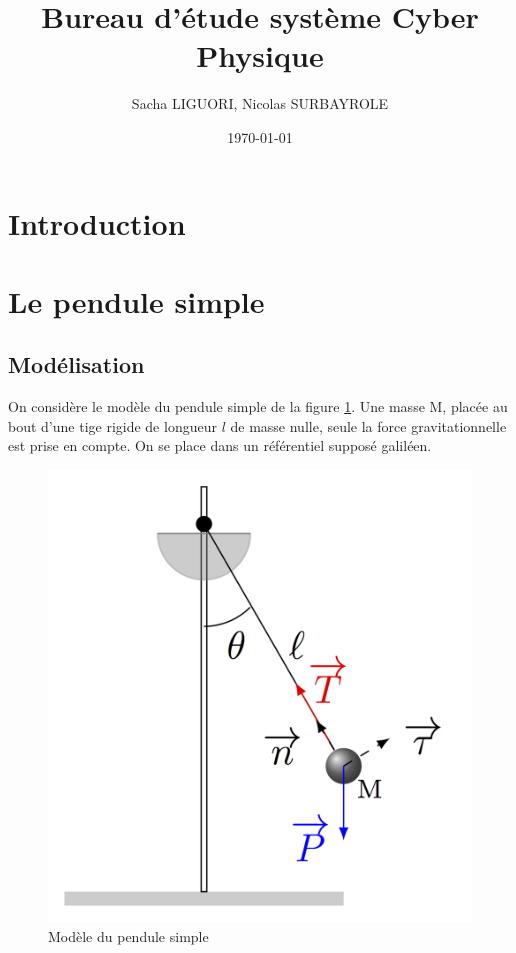 \documentclass[11pt]{article}
\author{Sacha LIGUORI, Nicolas SURBAYROLE}
\title{Bureau d'étude système Cyber Physique}
\date{\today}
\begin{document}
\maketitle

\tableofcontents

\newpage

\section*{Introduction}

\section{Le pendule simple}
\subsection{Modélisation}
On considère le modèle du pendule simple de la figure \ref{model_pendule}. Une masse M, placée au bout d'une tige rigide de longueur $l$ de masse nulle, seule la force gravitationnelle est prise en compte. On se place dans un référentiel supposé galiléen.
\begin{figure}[H]
	\includegraphics[scale=2]{images/modele_pendule}
	\caption{Modèle du pendule simple}
	\label{model_pendule}
\end{figure}
\end{document}
